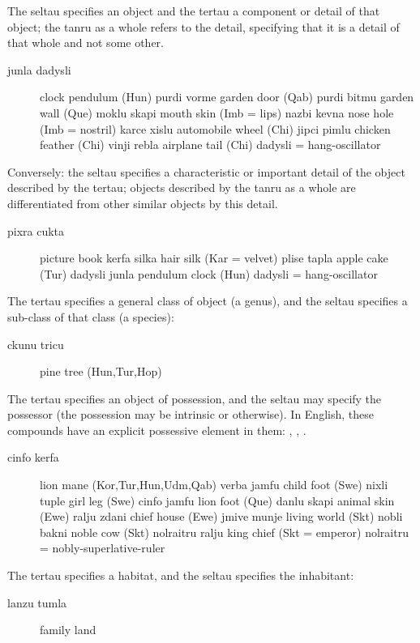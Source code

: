 The seltau specifies an object and the tertau a component or
    detail of that object; the tanru as a whole refers to the
    detail, specifying that it is a detail of that whole and not
    some other. 
\begin{description}
\item[junla dadysli] clock pendulum (Hun) purdi vorme garden door (Qab) purdi bitmu garden wall (Que) moklu skapi mouth skin (Imb = lips) nazbi kevna nose hole (Imb = nostril) karce xislu automobile wheel (Chi) jipci pimlu chicken feather (Chi) vinji rebla airplane tail (Chi) dadysli = hang-oscillator
\end{description}

Conversely: the seltau specifies a characteristic or important
    detail of the object described by the tertau; objects described
    by the tanru as a whole are differentiated from other similar
    objects by this detail. 
\begin{description}
\item[pixra cukta] picture book kerfa silka hair silk (Kar = velvet) plise tapla apple cake (Tur) dadysli junla pendulum clock (Hun) dadysli = hang-oscillator
\end{description}

The tertau specifies a general class of object (a genus), and
    the seltau specifies a sub-class of that class (a species): 
\begin{description}
\item[ckunu tricu] pine tree (Hun,Tur,Hop)
\end{description}

The tertau specifies an object of possession, and the seltau
    may specify the possessor (the possession may be intrinsic or
    otherwise). In English, these compounds have an explicit
    possessive element in them: , ,
    . 
\begin{description}
\item[cinfo kerfa] lion mane (Kor,Tur,Hun,Udm,Qab) verba jamfu child foot (Swe) nixli tuple girl leg (Swe) cinfo jamfu lion foot (Que) danlu skapi animal skin (Ewe) ralju zdani chief house (Ewe) jmive munje living world (Skt) nobli bakni noble cow (Skt) nolraitru ralju king chief (Skt = emperor) nolraitru = nobly-superlative-ruler
\end{description}

The tertau specifies a habitat, and the seltau specifies the
    inhabitant: 
\begin{description}
\item[lanzu tumla] family land
\end{description}


